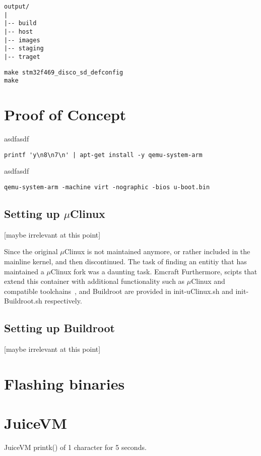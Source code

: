 \begin{lstlisting}[caption=Buildroot output directory, label=buildoutputdir]
output/
|
|-- build
|-- host
|-- images
|-- staging
|-- traget
\end{lstlisting}


\begin{lstlisting}[style=SH, caption=Compiling, label=compQEMUuboot]
make stm32f469_disco_sd_defconfig
make
\end{lstlisting}

\section{Proof of Concept}

asdfasdf
\begin{lstlisting}[caption=Installing QEMU in the container]
printf 'y\n8\n7\n' | apt-get install -y qemu-system-arm
\end{lstlisting}
asdfasdf

\begin{lstlisting}[style=SH, caption=Running U-Boot with QEMU, label=compQEMUuboot]
qemu-system-arm -machine virt -nographic -bios u-boot.bin
\end{lstlisting}


\subsection{Setting up $\mu$Clinux}
[maybe irrelevant at this point]

Since the original $\mu$Clinux is not maintained anymore, or rather included in the mainline kernel, and then discontinued. The task of finding an entitiy that has maintained a $\mu$Clinux fork was a daunting task. Emcraft 
Furthermore, scipts that extend this container with additional functionality such as $\mu$Clinux and compatible toolchains~\cite{emuClinux, emUboot}, and Buildroot are provided in init-uClinux.sh and init-Buildroot.sh respectively.

\subsection{Setting up Buildroot}
[maybe irrelevant at this point]


\section{Flashing binaries} \label{flashing.ch}

\section{JuiceVM}
JuiceVM printk() of 1 character for 5 seconds.
